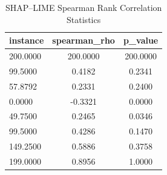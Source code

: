 \begin{table}
\centering
\caption{SHAP–LIME Spearman Rank Correlation Statistics}
\label{tab:agreement}
\begin{tabular}{lcc}
\toprule
instance & spearman_rho & p_value \\
\midrule
200.0000 & 200.0000 & 200.0000 \\
99.5000 & 0.4182 & 0.2341 \\
57.8792 & 0.2331 & 0.2400 \\
0.0000 & -0.3321 & 0.0000 \\
49.7500 & 0.2465 & 0.0346 \\
99.5000 & 0.4286 & 0.1470 \\
149.2500 & 0.5886 & 0.3758 \\
199.0000 & 0.8956 & 1.0000 \\
\bottomrule
\end{tabular}
\end{table}
